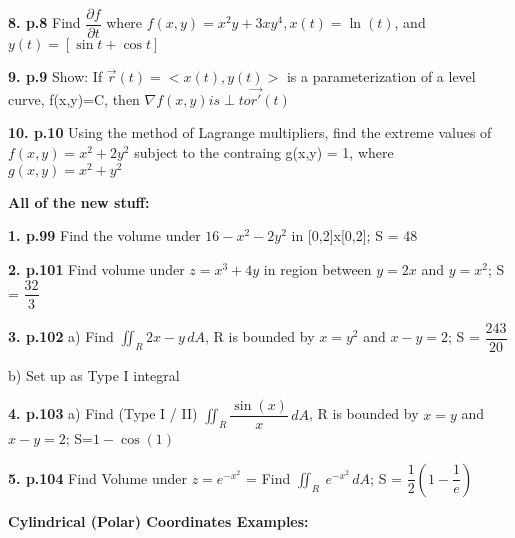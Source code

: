 \documentclass{article}
\begin{document}
\vspace{5mm}
\textbf{8. p.8} Find $\dfrac{\partial f}{\partial t}$ where $f(x,y) = x^2y+3xy^4, x(t)=\ln(t)$, and $y(t) = [\sin t + \cos t]$

\vspace{5mm}
\textbf{9. p.9} Show: If $\Vec{r}(t) = <x(t),y(t)>$ is a parameterization of a level curve, f(x,y)=C, then $\nabla f(x,y) is \perp to \Vec{r'}(t)$

\vspace{5mm}
\textbf{10. p.10} Using the method of Lagrange multipliers, find the extreme values of $f(x,y) = x^2+2y^2$ subject to the contraing g(x,y) = 1, where $g(x,y)=x^2+y^2$


\vspace{15mm}
{\Large \textbf{All of the new stuff:}}

\vspace{10mm}
\textbf{1. p.99} Find the volume under \(16-x^2 - 2y^2\) in [0,2]x[0,2]; {\color{blue}S = 48}

\vspace{5mm}
\textbf{2. p.101} Find volume under \(z=x^3+4y\) in region between \(y=2x\) and \(y=x^2\); {\color{blue}S = $\dfrac{32}{3}$}

\vspace{5mm}
\textbf{3. p.102} a) Find \displaystyle $\iint_R 2x-y \,dA$,
    R is bounded by $x=y^2$ and $x-y=2$; {\color{blue}S = $\dfrac{243}{20}$}
    
    b) Set up as Type I integral
    
\vspace{5mm}
\textbf{4. p.103} a) Find (Type I / II) \displaystyle $\iint_R \dfrac{\sin(x)}{x} \,dA$,
    R is bounded by \(x=y\) and \(x-y=2\); {\color{blue} S=$1-\cos(1)$}
    
\vspace{5mm}
\textbf{5. p.104} Find Volume under $z=e^{-x^2}$ = Find \displaystyle $\iint_R \ e^{-x^2} \,dA$;  {\color{blue}S = $\dfrac{1}{2}(1-\dfrac{1}{e})$}

\vspace{15mm}
{\Large \textbf{Cylindrical (Polar) Coordinates Examples:}}

\end{document}
